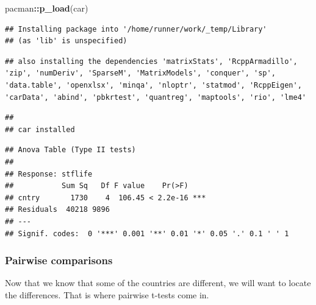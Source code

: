 \documentclass[
]{book}
\newenvironment{Shaded}{\begin{snugshade}}{\end{snugshade}}
\newcommand{\DataTypeTok}[1]{\textcolor[rgb]{0.13,0.29,0.53}{#1}}
\newcommand{\KeywordTok}[1]{\textcolor[rgb]{0.13,0.29,0.53}{\textbf{#1}}}
\newcommand{\NormalTok}[1]{#1}
\newcommand{\OperatorTok}[1]{\textcolor[rgb]{0.81,0.36,0.00}{\textbf{#1}}}
\newcommand{\StringTok}[1]{\textcolor[rgb]{0.31,0.60,0.02}{#1}}
\begin{document}
\begin{Shaded}
\begin{Highlighting}[]
\NormalTok{pacman}\OperatorTok{::}\KeywordTok{p_load}\NormalTok{(car)}
\end{Highlighting}
\end{Shaded}

\begin{verbatim}
## Installing package into '/home/runner/work/_temp/Library'
## (as 'lib' is unspecified)
\end{verbatim}

\begin{verbatim}
## also installing the dependencies 'matrixStats', 'RcppArmadillo', 'zip', 'numDeriv', 'SparseM', 'MatrixModels', 'conquer', 'sp', 'data.table', 'openxlsx', 'minqa', 'nloptr', 'statmod', 'RcppEigen', 'carData', 'abind', 'pbkrtest', 'quantreg', 'maptools', 'rio', 'lme4'
\end{verbatim}

\begin{verbatim}
## 
## car installed
\end{verbatim}

\begin{Shaded}
\end{Shaded}

\begin{verbatim}
## Anova Table (Type II tests)
## 
## Response: stflife
##           Sum Sq   Df F value    Pr(>F)    
## cntry       1730    4  106.45 < 2.2e-16 ***
## Residuals  40218 9896                      
## ---
## Signif. codes:  0 '***' 0.001 '**' 0.01 '*' 0.05 '.' 0.1 ' ' 1
\end{verbatim}

\hypertarget{pairwise-comparisons}{%
\subsubsection{Pairwise comparisons}\label{pairwise-comparisons}}

Now that we know that some of the countries are different, we will want to locate the differences. That is where pairwise t-tests come in.

\begin{Shaded}
\end{Shaded}
\end{document}
